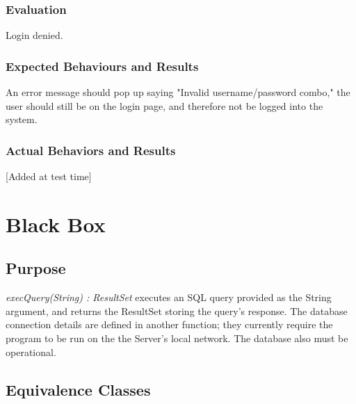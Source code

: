 \documentclass{article}
\begin{document}
\subsubsection{Evaluation}
Login denied.

\subsubsection{Expected Behaviours and Results}
An error message should pop up saying "Invalid username/password combo," the user should still be on the login page, and therefore not be logged into the system.

\subsubsection{Actual Behaviors and Results}
[Added at test time]

\section{Black Box}
\subsection{Purpose}
\textit{execQuery(String) : ResultSet} executes an SQL query provided as the String argument, and returns the ResultSet storing the query's response.  The database connection details are defined in another function; they currently require the program to be run on the the Server's local network.  The database also must be operational.

\subsection{Equivalence Classes}
\end{document}
